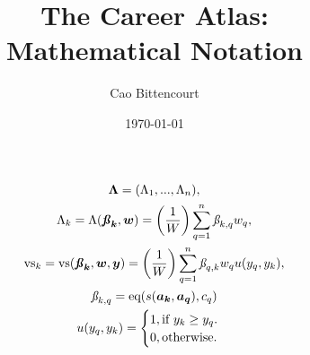\documentclass{article}
\title{
    The Career Atlas:\\
    Mathematical Notation
}
\author{Cao Bittencourt}
\date{\today}
\begin{document}
\maketitle

\begin{gather}
    \boldsymbol{\Lambda} = (\Lambda_{1}, ..., \Lambda_{n}),\\
    \Lambda_k = 
    \Lambda(\boldsymbol{\textbf{\textit{\ss}}_{k}}, \boldsymbol{w}) = 
        \left(
            \frac{1}{W}
        \right)
        \sum_{q=1}^{n}{
            \textit{\ss}_{k,q}
            w_q
        },\\
    \text{vs}_k = 
    \text{vs}(\boldsymbol{\textbf{\textit{\ss}}_{k}}, \boldsymbol{w}, \boldsymbol{y}) = 
    \left(
        \frac{1}{W}
    \right)
        \sum_{q=1}^{n}{
            \textit{\ss}_{q,k}
            w_q
            u(y_q,y_k)
        }
        ,\\
    \textit{\ss}_{k,q} = 
        \text{eq}(s(\boldsymbol{a_k},\boldsymbol{a_q}), c_q)\\
    u(y_q,y_k) =
    \begin{cases}
        1, \text{if } y_k \geq y_q.\\
        0, \text{otherwise.}
    \end{cases}\\

\end{gather}
\end{document}
